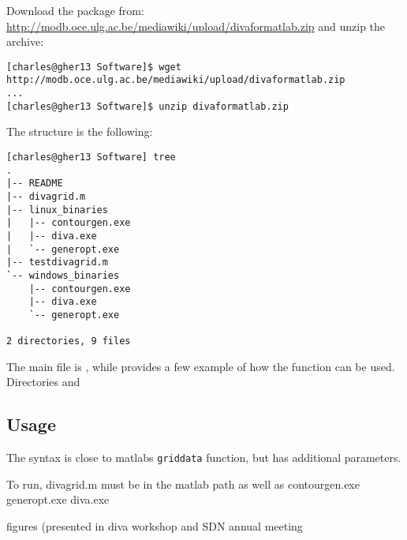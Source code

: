 Download the package from: \url{http://modb.oce.ulg.ac.be/mediawiki/upload/divaformatlab.zip}
and unzip the archive:
\begin{lstlisting}[style=Bash]
[charles@gher13 Software]$ wget http://modb.oce.ulg.ac.be/mediawiki/upload/divaformatlab.zip
...
[charles@gher13 Software]$ unzip divaformatlab.zip
\end{lstlisting}

The structure is the following:
\begin{lstlisting}[style=Bash]
[charles@gher13 Software] tree
.
|-- README
|-- divagrid.m
|-- linux_binaries
|   |-- contourgen.exe
|   |-- diva.exe
|   `-- generopt.exe
|-- testdivagrid.m
`-- windows_binaries
    |-- contourgen.exe
    |-- diva.exe
    `-- generopt.exe

2 directories, 9 files
\end{lstlisting}

The main file is , while  provides a few example of how the function can be used.
Directories  and 
\subsection{Usage}

The syntax  is close to matlabs \texttt{griddata} function, but has additional parameters.

To run, divagrid.m must be in the matlab path as well as
contourgen.exe
generopt.exe
diva.exe


figures (presented in diva workshop and SDN annual meeting
